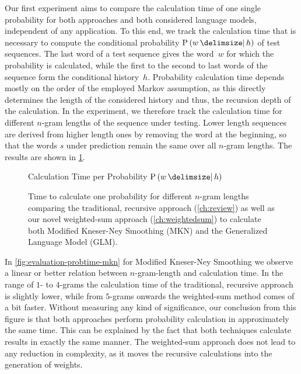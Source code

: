Our first experiment aims to compare the calculation time of one single
probability for both approaches and both considered language models, independent
of any application.
To this end, we track the calculation time that is necessary to compute
the conditional probability $\Prob{w}{h}$ of test sequences.
The last word of a test sequence gives the word~$w$ for which the probability is
calculated, while the first to the second to last words of the sequence form
the conditional history~$h$.
Probability calculation time depends mostly on the order of the employed Markov
assumption, as this directly determines the length of the considered history
and thus, the recursion depth of the calculation.
In the experiment, we therefore track the calculation time for different
$n$-gram lengths of the sequence under testing.
Lower length sequences are derived from higher length ones by removing the
word at the beginning, so that the words $s$ under prediction remain the same
over all $n$-gram lengths.
The results are shown in \cref{fig:evaluation-probtime}.

\begin{figure}
  \begin{center}
    Calculation Time per Probability $\Prob{w}{h}$
  \end{center}

  \hspace{-0.21\textwidth}
  \caption{Time to calculate one probability for different $n$-gram lengths
    comparing the traditional, recursive approach (\cref{ch:review}) as well as
    our novel weighted-sum approach (\cref{ch:weightedsum}) to calculate both
    Modified Kneser-Ney Smoothing (MKN) and the Generalized Language Model
    (GLM).}
  \label{fig:evaluation-probtime}
\end{figure}

In \cref{fig:evaluation-probtime-mkn} for Modified Kneser-Ney Smoothing we
observe a linear or better relation between $n$-gram-length and calculation
time.
In the range of $1$- to $4$-grams the calculation time of the traditional,
recursive approach is slightly lower, while from $5$-grams onwards the
weighted-sum method comes of a bit faster.
Without measuring any kind of significance, our conclusion from this figure is
that both approaches perform probability calculation in approximately the same
time.
This can be explained by the fact that both techniques calculate results in
exactly the same manner.
The weighted-sum approach does not lead to any reduction in complexity, as it
moves the recursive calculations into the generation of weights.

